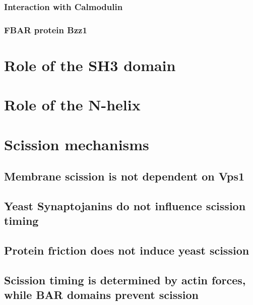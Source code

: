 			\subsubsection{Interaction with Calmodulin}
			\subsubsection{FBAR protein Bzz1}
				
\section{Role of the SH3 domain}		
\section{Role of the N-helix}			
		
\section{Scission mechanisms}

	\subsection{Membrane scission is not dependent on Vps1}
	\subsection{Yeast Synaptojanins do not influence scission timing}
	\subsection{Protein friction does not induce yeast scission }
	\subsection{Scission timing is determined by actin forces, while BAR domains prevent scission}